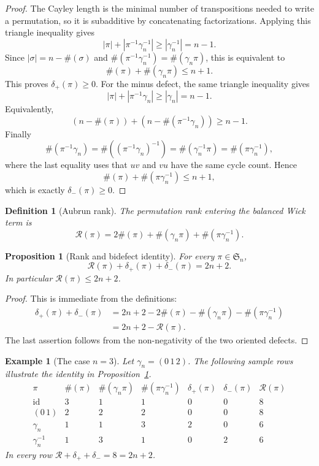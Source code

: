 \documentclass[11pt]{article}
\numberwithin{equation}{section}
\newtheorem{proposition}[theorem]{Proposition}
\newtheorem{definition}[theorem]{Definition}
\newtheorem{example}[theorem]{Example}
\newcommand{\Sym}{\mathfrak S}
\newcommand{\cyc}{\#}
\newcommand{\gammacyc}{\gamma_n}
\newcommand{\dplus}{\delta_+}
\newcommand{\dminus}{\delta_-}
\newcommand{\rank}{\mathcal R}
\begin{document}
\begin{proof}
The Cayley length is the minimal number of transpositions needed to write a
permutation, so it is subadditive by concatenating factorizations.  Applying
this triangle inequality gives
\[
  |\pi|+|\pi^{-1}\gammacyc^{-1}|\ge |\gammacyc^{-1}|=n-1.
\]
Since \(|\sigma|=n-\cyc(\sigma)\) and
\(\cyc(\pi^{-1}\gammacyc^{-1})=\cyc(\gammacyc\pi)\), this is equivalent to
\[
  \cyc(\pi)+\cyc(\gammacyc\pi)\le n+1.
\]
This proves \(\dplus(\pi)\ge0\).  For the minus defect, the same triangle
inequality gives
\[
  |\pi|+|\pi^{-1}\gammacyc|\ge |\gammacyc|=n-1.
\]
Equivalently,
\[
  (n-\cyc(\pi))+(n-\cyc(\pi^{-1}\gammacyc))\ge n-1.
\]
Finally
\[
  \cyc(\pi^{-1}\gammacyc)
  =
  \cyc((\pi^{-1}\gammacyc)^{-1})
  =
  \cyc(\gammacyc^{-1}\pi)
  =
  \cyc(\pi\gammacyc^{-1}),
\]
where the last equality uses that \(uv\) and \(vu\) have the same cycle
count.  Hence
\[
  \cyc(\pi)+\cyc(\pi\gammacyc^{-1})\le n+1,
\]
which is exactly \(\dminus(\pi)\ge0\).
\end{proof}

\begin{definition}[Aubrun rank]
The permutation rank entering the balanced Wick term is
\[
  \rank(\pi)=2\cyc(\pi)+\cyc(\gammacyc\pi)+\cyc(\pi\gammacyc^{-1}).
\]
\end{definition}

\begin{proposition}[Rank and bidefect identity]\label{prop:rank}
For every \(\pi\in\Sym_n\),
\[
  \rank(\pi)+\dplus(\pi)+\dminus(\pi)=2n+2.
\]
In particular \(\rank(\pi)\le 2n+2\).
\end{proposition}

\begin{proof}
This is immediate from the definitions:
\[
\begin{aligned}
  \dplus(\pi)+\dminus(\pi)
  &=
  2n+2
  -2\cyc(\pi)
  -\cyc(\gammacyc\pi)
  -\cyc(\pi\gammacyc^{-1}) \\
  &=2n+2-\rank(\pi).
\end{aligned}
\]
The last assertion follows from the non-negativity of the two oriented
defects.
\end{proof}

\begin{example}[The case \(n=3\)]
Let \(\gammacyc=(0\,1\,2)\).  The following sample rows illustrate the
identity in Proposition~\ref{prop:rank}.
\[
\begin{array}{c|cccccc}
\pi & \cyc(\pi) & \cyc(\gammacyc\pi) & \cyc(\pi\gammacyc^{-1})
& \dplus(\pi) & \dminus(\pi) & \rank(\pi)\\
\hline
\mathrm{id} & 3 & 1 & 1 & 0 & 0 & 8\\
(0\,1) & 2 & 2 & 2 & 0 & 0 & 8\\
\gammacyc & 1 & 1 & 3 & 2 & 0 & 6\\
\gammacyc^{-1} & 1 & 3 & 1 & 0 & 2 & 6
\end{array}
\]
In every row \(\rank+\dplus+\dminus=8=2n+2\).
\end{example}
\end{document}
